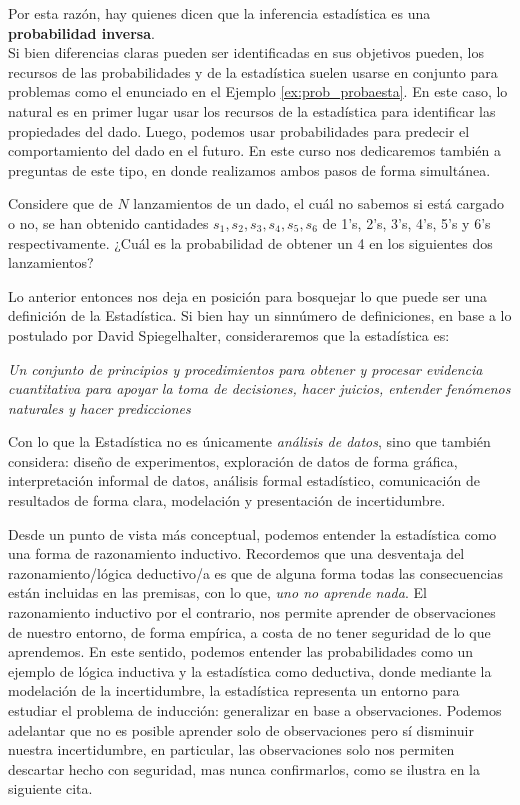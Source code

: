 Por esta razón, hay quienes dicen que la inferencia estadística es una \textbf{probabilidad inversa}.\\

Si bien diferencias claras pueden ser identificadas en sus objetivos pueden, los recursos de las probabilidades y de la estadística suelen usarse en conjunto para problemas como el enunciado en el Ejemplo \ref{ex:prob_probaesta}. En este caso, lo natural es en primer lugar usar los recursos de la estadística para identificar las propiedades del dado. Luego, podemos usar probabilidades para predecir el comportamiento del dado en el futuro. En este curso nos dedicaremos también a preguntas de este tipo, en donde realizamos ambos pasos de forma simultánea. 

\begin{example}
\label{ex:prob_probaesta}
Considere que de $N$ lanzamientos de un dado, el cuál no sabemos si está cargado o no, se han obtenido cantidades $s_1,s_2,s_3,s_4,s_5,s_6$ de 1's, 2's, 3's, 4's, 5's y 6's respectivamente. ¿Cuál es la probabilidad de obtener un 4 en los siguientes dos lanzamientos?
\end{example}

Lo anterior entonces nos deja en posición para bosquejar lo que puede ser una definición de la Estadística. Si bien hay un sinnúmero de definiciones, en base a lo postulado por David Spiegelhalter, consideraremos que la estadística es: 
\begin{center}
\it 
    Un conjunto de principios y procedimientos para obtener y procesar evidencia cuantitativa para apoyar la toma de decisiones, hacer juicios, entender fenómenos naturales y hacer predicciones
\end{center}

Con lo que la Estadística no es únicamente \emph{análisis de datos}, sino que también considera: diseño de experimentos, exploración de datos de forma gráfica, interpretación informal de datos, análisis formal estadístico, comunicación de resultados de forma clara, modelación y presentación de incertidumbre. 

Desde un punto de vista más conceptual, podemos entender la estadística como una forma de razonamiento inductivo. Recordemos que una desventaja del razonamiento/lógica deductivo/a es que de alguna forma todas las consecuencias están incluidas en las premisas, con lo que, \emph{uno no aprende nada}. El razonamiento inductivo por el contrario, nos permite aprender de observaciones de nuestro entorno, de forma empírica, a costa de no tener seguridad de lo que aprendemos. En este sentido, podemos entender las probabilidades como un ejemplo de lógica inductiva y la estadística como deductiva, donde mediante la modelación de la incertidumbre, la estadística representa un entorno para estudiar el problema de inducción: generalizar en base a observaciones. Podemos adelantar que no es posible aprender solo de observaciones pero sí disminuir nuestra incertidumbre, en particular, las observaciones solo nos permiten descartar hecho con seguridad, mas nunca confirmarlos, como se ilustra en la siguiente cita. 


